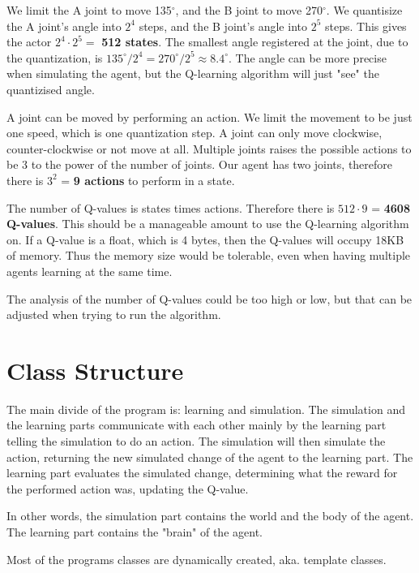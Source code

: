 \documentclass{article}
\begin{document}
We limit the A joint to move 135$^\circ$, and the B joint to move
270$^\circ$. We quantisize the A joint's angle into $2^4$ steps, and
the B joint's angle into $2^5$ steps. This gives the actor
$2^4 \cdot 2^5 =$ \textbf{512 states}. The smallest angle registered at
the joint, due to the quantization, is
$135^\circ / 2^4 = 270^\circ / 2^5 \approx 8.4^\circ$.
The angle can be more precise when simulating the agent, but the
Q-learning algorithm will just "see" the quantizised angle.

A joint can be moved by performing an action. We limit the movement to be
just one speed, which is one quantization step. A joint can only move
clockwise, counter-clockwise or not move at all. Multiple joints raises the
possible actions to be 3 to the power of the number of joints. Our
agent has two joints, therefore there is $3^2$ = \textbf{9 actions} to
perform in a state.

The number of Q-values is states times actions. Therefore there is
$512 \cdot 9$ = \textbf{4608 Q-values}. This should be a manageable
amount to use the Q-learning algorithm on. If a Q-value is a float,
which is 4 bytes, then the Q-values will occupy 18KB of memory.
Thus the memory size would be tolerable, even when having multiple agents
learning at the same time.

The analysis of the number of Q-values could be too high or low, but that
can be adjusted when trying to run the algorithm.



\section{Class Structure}
The main divide of the program is: learning and simulation. The
simulation and the learning parts communicate with each other mainly by the
learning part telling the simulation to do an action. The simulation will then
simulate the action, returning the new simulated change of the agent to the
learning part. The learning part evaluates the simulated change, determining
what the reward for the performed action was, updating the Q-value.

In other words, the simulation part contains the world and the body of the
agent. The learning part contains the "brain" of the agent.

Most of the programs classes are dynamically created, aka. template classes.
\end{document}
